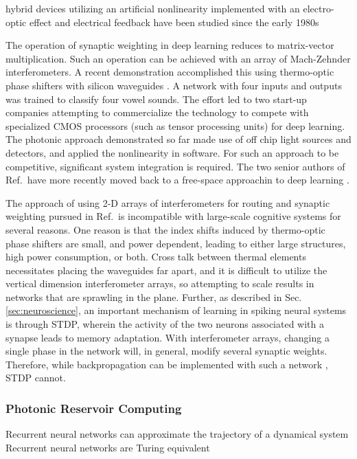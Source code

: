 hybrid devices utilizing an artificial nonlinearity implemented with an electro-optic effect and electrical feedback have been studied since the early 1980s \cite{sm1980,ko1981}

The operation of synaptic weighting in deep learning reduces to matrix-vector multiplication. Such an operation can be achieved with an array of Mach-Zehnder interferometers. A recent demonstration accomplished this using thermo-optic phase shifters with silicon waveguides \cite{shha2016}. A network with four inputs and outputs was trained to classify four vowel sounds. The effort led to two start-up companies attempting to commercialize the technology to compete with specialized CMOS processors (such as tensor processing units) for deep learning. The photonic approach demonstrated so far made use of off chip light sources and detectors, and applied the nonlinearity in software. For such an approach to be competitive, significant system integration is required. The two senior authors of Ref.\,\cite{shha2016} have more recently moved back to a free-space approachin to deep learning \cite{}.

The approach of using 2-D arrays of interferometers for routing and synaptic weighting pursued in Ref.\,\cite{shha2017} is incompatible with large-scale cognitive systems for several reasons. One reason is that the index shifts induced by thermo-optic phase shifters are small, and power dependent, leading to either large structures, high power consumption, or both. Cross talk between thermal elements necessitates placing the waveguides far apart, and it is difficult to utilize the vertical dimension interferometer arrays, so attempting to scale results in networks that are sprawling in the plane. Further, as described in Sec.\,\ref{sec:neuroscience}, an important mechanism of learning in spiking neural systems is through STDP, wherein the activity of the two neurons associated with a synapse leads to memory adaptation. With interferometer arrays, changing a single phase in the network will, in general, modify several synaptic weights. Therefore, while backpropagation can be implemented with such a network \cite{humi2018}, STDP cannot. 

\subsubsection{Photonic Reservoir Computing}

\vspace{3em}
Recurrent neural networks can approximate the trajectory of a dynamical system \cite{funa1993}
Recurrent neural networks are Turing equivalent \cite{kisi1996}

